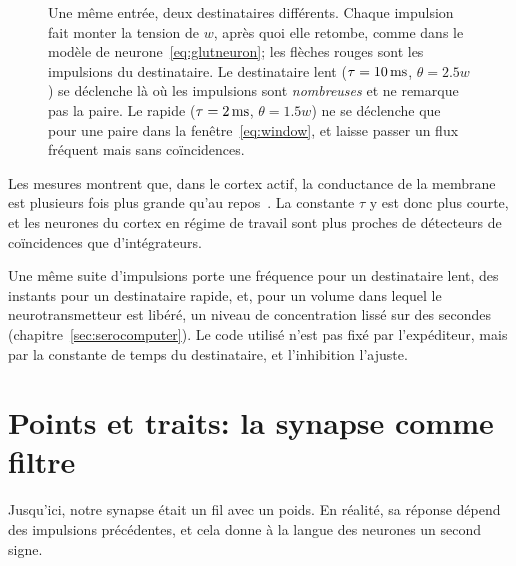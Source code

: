 \begin{figure}[t]
\caption{Une même entrée, deux destinataires différents. Chaque impulsion fait monter la tension de $w$, après quoi elle retombe, comme dans le modèle de neurone~\eqref{eq:glutneuron}; les flèches rouges sont les impulsions du destinataire. Le destinataire lent ($\tau=10\,\text{ms}$, $\theta=2.5w$) se déclenche là où les impulsions sont \emph{nombreuses} et ne remarque pas la paire. Le rapide ($\tau=2\,\text{ms}$, $\theta=1.5w$) ne se déclenche que pour une paire dans la fenêtre~\eqref{eq:window}, et laisse passer un flux fréquent mais sans coïncidences.}
\label{fig:reader}
\end{figure}

Les mesures montrent que, dans le cortex actif, la conductance de la membrane est plusieurs fois plus grande qu'au repos~\cite{Destexhe2003}. La constante $\tau$ y est donc plus courte, et les neurones du cortex en régime de travail sont plus proches de détecteurs de coïncidences que d'intégrateurs.

\begin{keyblock}
\begin{proposition}
\label{prop:reader}
Une même suite d'impulsions porte une fréquence pour un destinataire lent, des instants pour un destinataire rapide, et, pour un volume dans lequel le neurotransmetteur est libéré, un niveau de concentration lissé sur des secondes (chapitre~\ref{sec:serocomputer}). Le code utilisé n'est pas fixé par l'expéditeur, mais par la constante de temps du destinataire, et l'inhibition l'ajuste.
\end{proposition}
\end{keyblock}
\section{Points et traits: la synapse comme filtre}

Jusqu'ici, notre synapse était un fil avec un poids. En réalité, sa réponse dépend des impulsions précédentes, et cela donne à la langue des neurones un second signe.

